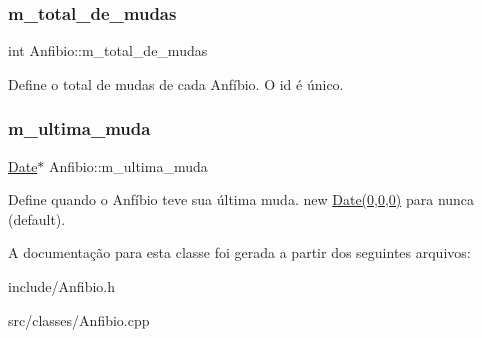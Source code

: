 \subsubsection{\texorpdfstring{m\+\_\+total\+\_\+de\+\_\+mudas}{m\_total\_de\_mudas}}
{\footnotesize\ttfamily int Anfibio\+::m\+\_\+total\+\_\+de\+\_\+mudas\hspace{0.3cm}{\ttfamily [protected]}}

Define o total de mudas de cada Anfíbio. O id é único. \mbox{\label{classAnfibio_abc4969388066028d800dd134d3fc3ae9}} 
\subsubsection{\texorpdfstring{m\+\_\+ultima\+\_\+muda}{m\_ultima\_muda}}
{\footnotesize\ttfamily \hyperlink{classDate}{Date}$\ast$ Anfibio\+::m\+\_\+ultima\+\_\+muda\hspace{0.3cm}{\ttfamily [protected]}}

Define quando o Anfíbio teve sua última muda. new \hyperlink{classDate}{Date(0,0,0)} para nunca (default). 

A documentação para esta classe foi gerada a partir dos seguintes arquivos\+:\begin{DoxyCompactItemize}
\item 
include/Anfibio.\+h\item 
src/classes/Anfibio.\+cpp\end{DoxyCompactItemize}
